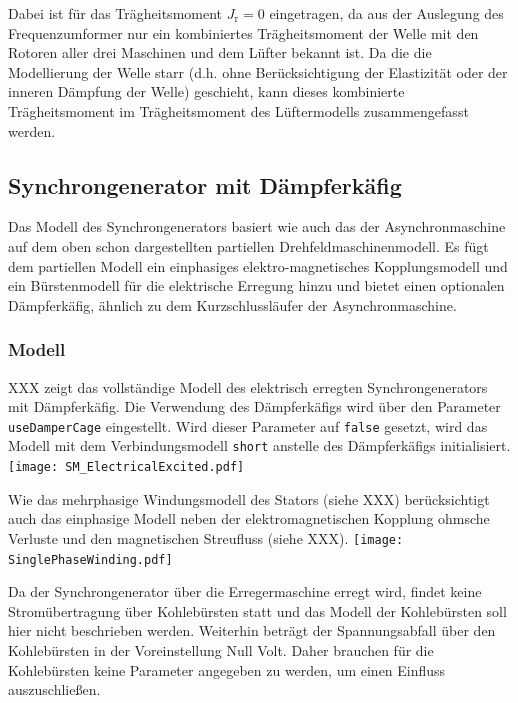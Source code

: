 Dabei ist für das Trägheitsmoment \(J_{\mathrm{r}}=0\) eingetragen, da
aus der Auslegung des Frequenzumformer nur ein kombiniertes
Trägheitsmoment der Welle mit den Rotoren aller drei Maschinen und dem
Lüfter bekannt ist. Da die die Modellierung der Welle starr (d.h. ohne
Berücksichtigung der Elastizität oder der inneren Dämpfung der Welle)
geschieht, kann dieses kombinierte Trägheitsmoment im Trägheitsmoment
des Lüftermodells zusammengefasst werden.

\hypertarget{synchrongenerator-mit-duxe4mpferkuxe4fig}{%
\subsection{Synchrongenerator mit
Dämpferkäfig}\label{synchrongenerator-mit-duxe4mpferkuxe4fig}}

Das Modell des Synchrongenerators basiert wie auch das der
Asynchronmaschine auf dem oben schon dargestellten partiellen
Drehfeldmaschinenmodell. Es fügt dem partiellen Modell ein einphasiges
elektro-magnetisches Kopplungsmodell und ein Bürstenmodell für die
elektrische Erregung hinzu und bietet einen optionalen Dämpferkäfig,
ähnlich zu dem Kurzschlussläufer der Asynchronmaschine.

\hypertarget{modell-1}{%
\subsubsection{Modell}\label{modell-1}}

XXX zeigt das vollständige Modell des elektrisch erregten
Synchrongenerators mit Dämpferkäfig. Die Verwendung des Dämpferkäfigs
wird über den Parameter \texttt{useDamperCage} eingestellt. Wird dieser
Parameter auf \texttt{false} gesetzt, wird das Modell mit dem
Verbindungsmodell \texttt{short} anstelle des Dämpferkäfigs
initialisiert. \texttt{[image: SM\_ElectricalExcited.pdf]}

Wie das mehrphasige Windungsmodell des Stators (siehe XXX)
berücksichtigt auch das einphasige Modell neben der elektromagnetischen
Kopplung ohmsche Verluste und den magnetischen Streufluss (siehe XXX).
\texttt{[image: SinglePhaseWinding.pdf]}

Da der Synchrongenerator über die Erregermaschine erregt wird, findet
keine Stromübertragung über Kohlebürsten statt und das Modell der
Kohlebürsten soll hier nicht beschrieben werden. Weiterhin beträgt der
Spannungsabfall über den Kohlebürsten in der Voreinstellung Null Volt.
Daher brauchen für die Kohlebürsten keine Parameter angegeben zu werden,
um einen Einfluss auszuschließen.

